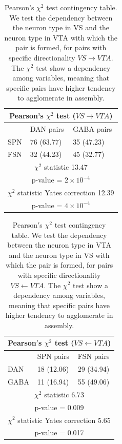 \begin{table}[H]
\begin{tabular}{ |p{3cm}|p{3cm}|p{3cm}| }
 \hline
 \multicolumn{3}{|c|}{Pearson's $\chi^2$ test ($VS \rightarrow VTA$)} \\
 \hline
 & DAN pairs & GABA pairs\\
 \hline
 SPN & 76 (63.77) & 35 (47.23) \\
 \hline
 FSN & 32 (44.23) & 45 (32.77)\\
 \hline
 \multicolumn{3}{|c|}{$\chi^2$ statistic  13.47}\\
 \multicolumn{3}{|c|}{p-value = $2\times10^{-4}$}\\
 \hline
 \multicolumn{3}{|c|}{$\chi^2$ statistic Yates correction 12.39}\\
 \multicolumn{3}{|c|}{p-value = $4\times10^{-4}$}\\
 \hline
\end{tabular}
\caption{Pearson's $\chi^{2}$ test contingency table. We test the dependency between the neuron type in VS and the neuron type in VTA with which the pair is formed, for pairs with specific directionality $VS \rightarrow VTA$. The $\chi^2$ test show a dependency among variables, meaning that specific pairs have higher tendency to agglomerate in assembly.}
\label{tab:chisquare_vsvta}
\end{table}
\begin{table}[H]
\begin{tabular}{ |p{3cm}|p{3cm}|p{3cm}| }
 \hline
 \multicolumn{3}{|c|}{Pearson$'$s $\chi^2$ test ($VS \leftarrow VTA$)} \\
 \hline
 & SPN pairs & FSN pairs\\
 \hline
 DAN & 18 (12.06) & 29 (34.94) \\
 \hline
 GABA & 11 (16.94) & 55 (49.06)\\
 \hline
 \multicolumn{3}{|c|}{$\chi^2$ statistic  6.73}\\
 \multicolumn{3}{|c|}{p-value = 0.009}\\
 \hline
 \multicolumn{3}{|c|}{$\chi^2$ statistic Yates correction 5.65}\\
 \multicolumn{3}{|c|}{p-value = 0.017}\\
 \hline
\end{tabular}
\caption{Pearson$'$s $\chi^{2}$ test contingency table. We test the dependency between the neuron type in VTA and the neuron type in VS with which the pair is formed, for pairs with specific directionality $VS \leftarrow VTA$. The $\chi^2$ test show a dependency among variables, meaning that specific pairs have higher tendency to agglomerate in assembly.}
\label{tab:chisquare_vtavs}
\end{table}
